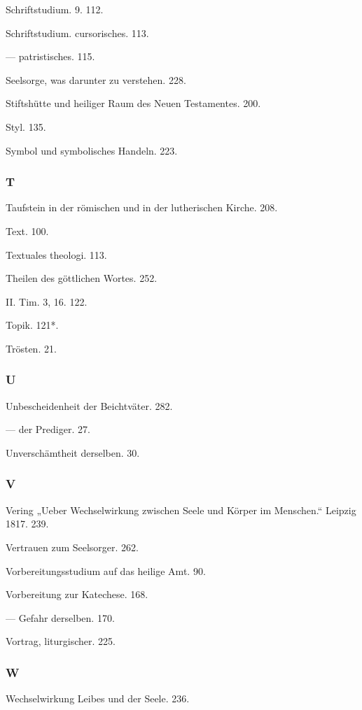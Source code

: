 Schriftstudium. 9. 112.

Schriftstudium. cursorisches. 113.

— patristisches. 115.

Seelsorge, was darunter zu verstehen. 228.

Stiftshütte und heiliger Raum des Neuen Testamentes. 200.

Styl. 135.

Symbol und symbolisches Handeln. 223.

\subsubsection{T}

Taufstein in der römischen und in der lutherischen Kirche. 208.

Text. 100.

Textuales theologi. 113.

Theilen des göttlichen Wortes. 252.

II. Tim. 3, 16. 122.

Topik. 121*.

Trösten. 21.

\subsubsection{U}

Unbescheidenheit der Beichtväter. 282.

— der Prediger. 27.

Unverschämtheit derselben. 30.

\subsubsection{V}

Vering „Ueber Wechselwirkung zwischen Seele und Körper im Menschen.“ Leipzig 1817. 239.

Vertrauen zum Seelsorger. 262.

Vorbereitungsstudium auf das heilige Amt. 90.

Vorbereitung zur Katechese. 168.

— Gefahr derselben. 170.

Vortrag, liturgischer. 225.

\subsubsection{W}

Wechselwirkung Leibes und der Seele. 236.

